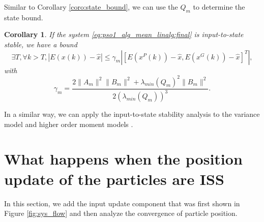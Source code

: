 \documentclass{sig-alternate}
\newtheorem{mycoro}{Corollary}
\begin{document}

Similar to Corollary \ref{coro:state_bound}, we can use the $ Q_{m} $ to determine the state bound.
\begin{mycoro}
If the system \eqref{eq:pso1_alg_mean_linalg:final} is input-to-state stable, we have a bound 
\begin{equation}
\exists T, \forall k > T, 
| E( x(k) ) - \hat{x} | \leq  \gamma_{m} | [ E( x^{P}(k) ) - \hat{x} ,  E( x^{G}(k) ) - \hat{x} ]^{T} |,
\end{equation}
with 
\begin{equation}
\gamma_{m} = \frac{ 2 \lVert A_{m} \rVert^{2} \lVert B_{m} \rVert^{2} + \lambda_{min}( Q_{m} )^{2} \lVert B_{m} \rVert^{2} }{ 2( \lambda_{min}( Q_{m} ) )^{3} }.
\end{equation}
\end{mycoro}

In a similar way, we can apply the input-to-state stability analysis to the variance model \cite{Jiang20078} and higher order moment models \cite{Poli:2007:EAS:1276958.1276977}.

\section{What happens when the position update of the particles are ISS}
\label{sec:sys_dynamics}


In this section, we add the input update component that was first shown in Figure \ref{fig:sys_flow} and then analyze the convergence of particle position.

\end{document}
